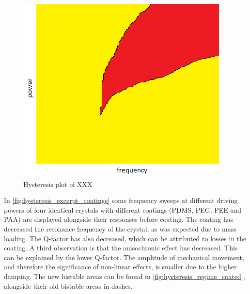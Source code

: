 \begin{figure}
	\centering
		\includegraphics[width=\textwidth]{figures/hysteresis_regime.png}
	\caption{Hysteresis plot of XXX}
	\label{fig:hysteresis_regime}
\end{figure}


In \autoref{fig:hysteresis_excerpt_coatings} some frequency sweeps at different driving powers of four identical crystals with different coatings (PDMS, PEG, PEE and PAA) are displayed alongside their responses before coating. The coating has decreased the resonance frequency of the crystal, as was expected due to mass loading. The Q-factor has also decreased, which can be attributed to losses in the coating. A third observation is that the anisochronic effect has decreased. This can be explained by the lower Q-factor. The amplitude of mechanical movement, and therefore the significance of non-linear effects, is smaller due to the higher damping. The new bistable areas can be found in \autoref{fig:hysteresis_regime_coated}, alongside their old bistable areas in dashes. 

